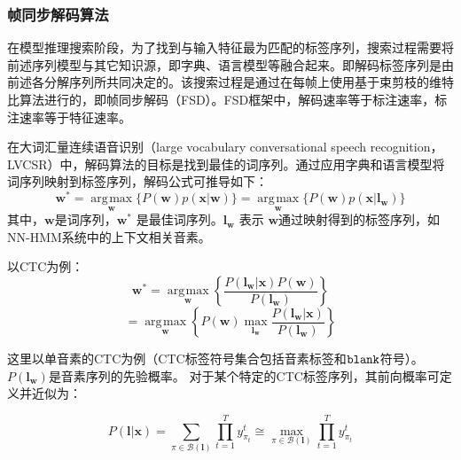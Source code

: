 \subsubsection{帧同步解码算法}
\label{chap:lsd-review-fsd}

在模型推理搜索阶段，为了找到与输入特征最为匹配的标签序列，搜索过程需要将前述序列模型与其它知识源，即字典、语言模型等融合起来。即解码标签序列是由前述各分解序列所共同决定的。该搜索过程是通过在每帧上使用基于束剪枝的维特比算法进行的\cite{forney1973viterbi}，即帧同步解码（FSD）。FSD框架中，解码速率等于标注速率，标注速率等于特征速率。


在大词汇量连续语音识别（large vocabulary conversational speech recognition， LVCSR）中，解码算法的目标是找到最佳的词序列。通过应用字典和语言模型将词序列映射到标签序列，解码公式可推导如下：
\begin{equation}\label{eq:asr-dec}
        \mathbf{w}^*=\mathop{\arg\!\max}\limits_\mathbf{w} \{
        P(\mathbf{w})p(\mathbf{x}|\mathbf{w})
        \}=\mathop{\arg\!\max}\limits_\mathbf{w} \{
        P(\mathbf{w})p(\mathbf{x}|\mathbf{l}_\mathbf{w})
        \} %
     \end{equation}
其中，$\mathbf{w}$是词序列，${\mathbf{w}}^*$ 是最佳词序列。$\mathbf{l}_{\mathbf{w}}$ 表示 $\mathbf{w}$通过映射得到的标签序列，如NN-HMM系统中的上下文相关音素。

以CTC为例：
\begin{equation}\label{eq:ctc-with-prior}
        \mathbf{w}^*=\mathop{\arg\!\max}\limits_\mathbf{w} \left\{
        \frac{P(\mathbf{l}_\mathbf{w}|\mathbf{x})P(\mathbf{w})}{P(\mathbf{l}_\mathbf{w})}
        \right\}
     \end{equation}
     \begin{equation} \label{eq:ctc-dec}
    = \mathop{\arg\!\max}\limits_\mathbf{w} \left\{
        P(\mathbf{w})
        \mathop{\max}\limits_{\mathbf{l}_\mathbf{w}} \frac{P( \mathbf{l}_\mathbf{w}|\mathbf{x} )}{P(\mathbf{l}_\mathbf{w})}\right\}
     \end{equation}

这里以单音素的CTC为例（CTC标签符号集合包括音素标签和$\tt blank$符号）。   $P(\mathbf{l}_\mathbf{w})$是音素序列的先验概率。
对于某个特定的CTC标签序列，其前向概率可定义\cite{graves2006connectionist}并近似为：

        \begin{equation} \label{eq:fwd-ctc}
        P(\mathbf{l}|\mathbf{x}) =
        \sum_{\pi\in\mathcal{B}(\mathbf{l})} %
           {\prod_{t=1}^{T}{y^{t}_{\pi_{t}}}}
        \cong \mathop{\max}\limits_{\pi\in\mathcal{B}(\mathbf{l})}
           {\prod_{t=1}^{T}{y^{t}_{\pi_{t}}}}
        \end{equation}


